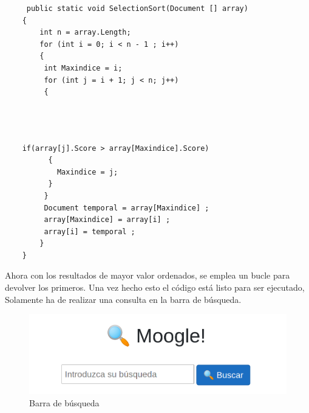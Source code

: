 \documentclass{beamer}
\begin{document}
\begin{frame}[fragile]

\begin{lstlisting}
     public static void SelectionSort(Document [] array)
    {
        int n = array.Length;
        for (int i = 0; i < n - 1 ; i++)
        {
         int Maxindice = i;
         for (int j = i + 1; j < n; j++)
         {
          
\end{lstlisting}

\end{frame}    

\begin{frame}[fragile]
    \begin{lstlisting}
        
    
    if(array[j].Score > array[Maxindice].Score)
          {
            Maxindice = j;
          }  
         } 
         Document temporal = array[Maxindice] ;
         array[Maxindice] = array[i] ;
         array[i] = temporal ; 
        }
    }
\end{lstlisting}

\end{frame}

\Large Ahora con los resultados de mayor valor ordenados, se emplea un bucle para devolver los primeros. Una vez hecho esto el código está listo para ser ejecutado, Solamente ha de realizar una consulta en la barra de búsqueda.

\vspace{1 cm}
\begin{figure}
        \includegraphics[width = 10 cm ]{./moogle.png}
    \caption{Barra de búsqueda}
    \end{figure}
\end{document}
